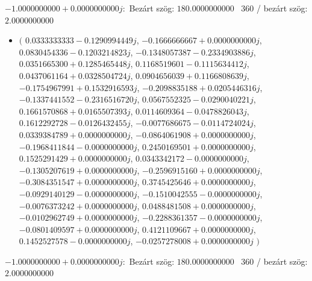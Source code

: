 \documentclass[14pt,a4paper]{article}
\begin{document}
$-1.0000000000+0.0000000000j$:\
Bezárt szög: $180.0000000000$ \
360 / bezárt szög: $2.0000000000$\
\begin{itemize}
\item
$\big($
$0.0333333333-0.1290994449j$, $-0.1666666667+0.0000000000j$, $0.0830454336-0.1203214823j$, $-0.1348057387-0.2334903886j$, $0.0351665300+0.1285465448j$, $0.1168519601-0.1115634412j$, $0.0437061164+0.0328504724j$, $0.0904656039+0.1166808639j$, $-0.1754967991+0.1532916593j$, $-0.2098835188+0.0205446316j$, $-0.1337441552-0.2316516720j$, $0.0567552325-0.0290040221j$, $0.1661570868+0.0165507393j$, $0.0114609364-0.0478826043j$, $0.1612292728-0.0126432455j$, $-0.0077686675-0.0114724024j$, $0.0339384789+0.0000000000j$, $-0.0864061908+0.0000000000j$, $-0.1968411844-0.0000000000j$, $0.2450169501+0.0000000000j$, $0.1525291429+0.0000000000j$, $0.0343342172-0.0000000000j$, $-0.1305207619+0.0000000000j$, $-0.2596915160+0.0000000000j$, $-0.3084351547+0.0000000000j$, $0.3745425646+0.0000000000j$, $-0.0929140129-0.0000000000j$, $-0.1510042555-0.0000000000j$, $-0.0076373242+0.0000000000j$, $0.0488481508+0.0000000000j$, $-0.0102962749+0.0000000000j$, $-0.2288361357-0.0000000000j$, $-0.0801409597+0.0000000000j$, $0.4121109667+0.0000000000j$, $0.1452527578-0.0000000000j$, $-0.0257278008+0.0000000000j$
$\big)$
\end{itemize}
$-1.0000000000+0.0000000000j$:\
Bezárt szög: $180.0000000000$ \
360 / bezárt szög: $2.0000000000$\
\end{document}
